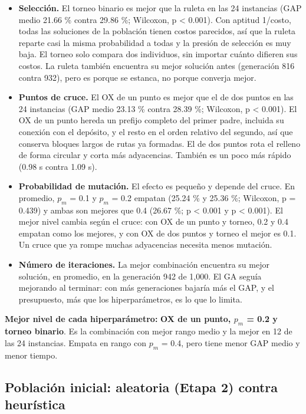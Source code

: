 \documentclass[11pt,letterpaper]{article}
\providecommand{\tightlist}{\setlength{\itemsep}{0pt}\setlength{\parskip}{0pt}}
\begin{document}
\begin{itemize}
\tightlist
\item
  \textbf{Selección.} El torneo binario es mejor que la ruleta en las 24 instancias (GAP medio 21.66 \% contra 29.86 \%; Wilcoxon, p \textless{} 0.001). Con aptitud 1/costo, todas las soluciones de la población tienen costos parecidos, así que la ruleta reparte casi la misma probabilidad a todas y la presión de selección es muy baja. El torneo solo compara dos individuos, sin importar cuánto difieren sus costos. La ruleta también encuentra su mejor solución antes (generación 816 contra 932), pero es porque se estanca, no porque converja mejor.
\item
  \textbf{Puntos de cruce.} El OX de un punto es mejor que el de dos puntos en las 24 instancias (GAP medio 23.13 \% contra 28.39 \%; Wilcoxon, p \textless{} 0.001). El OX de un punto hereda un prefijo completo del primer padre, incluida su conexión con el depósito, y el resto en el orden relativo del segundo, así que conserva bloques largos de rutas ya formadas. El de dos puntos rota el relleno de forma circular y corta más adyacencias. También es un poco más rápido (0.98 s contra 1.09 s).
\item
  \textbf{Probabilidad de mutación.} El efecto es pequeño y depende del cruce. En promedio, \(p_{m}\) = 0.1 y \(p_{m}\) = 0.2 empatan (25.24 \% y 25.36 \%; Wilcoxon, p = 0.439) y ambas son mejores que 0.4 (26.67 \%; p \textless{} 0.001 y p \textless{} 0.001). El mejor nivel cambia según el cruce: con OX de un punto y torneo, 0.2 y 0.4 empatan como los mejores, y con OX de dos puntos y torneo el mejor es 0.1. Un cruce que ya rompe muchas adyacencias necesita menos mutación.
\item
  \textbf{Número de iteraciones.} La mejor combinación encuentra su mejor solución, en promedio, en la generación 942 de 1,000. El GA seguía mejorando al terminar: con más generaciones bajaría más el GAP, y el presupuesto, más que los hiperparámetros, es lo que lo limita.
\end{itemize}

\textbf{Mejor nivel de cada hiperparámetro:} \textbf{OX de un punto, \(p_{m}\) = 0.2 y torneo binario}. Es la combinación con mejor rango medio y la mejor en 12 de las 24 instancias. Empata en rango con \(p_{m}\) = 0.4, pero tiene menor GAP medio y menor tiempo.

\hypertarget{poblaciuxf3n-inicial-aleatoria-etapa-2-contra-heuruxedstica}{%
\subsection{Población inicial: aleatoria (Etapa 2) contra heurística}\label{poblaciuxf3n-inicial-aleatoria-etapa-2-contra-heuruxedstica}}
\end{document}
